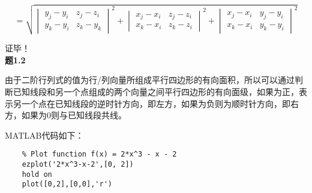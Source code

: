 \documentclass[UTF8]{ctexrep}
\begin{document}
$$
    = \sqrt{\begin{vmatrix}
            y_j-y_i & z_j-z_i \\
            y_k-y_i & z_k-y_k
        \end{vmatrix} ^2 + \begin{vmatrix}
            x_j-x_i & z_j-z_i \\
            x_k-x_i & z_k-z_i
        \end{vmatrix} ^2 + \begin{vmatrix}
            x_j-x_i & y_j-y_i \\
            x_k-x_i & y_k-y_i
        \end{vmatrix}^2}
$$

证毕！\\

{\noindent}\textbf{题1.2}

由于二阶行列式的值为行/列向量所组成平行四边形的有向面积，所以可以通过判断已知线段和另一个点组成的两个向量之间平行四边形的有向面级，如果为正，表示另一个点在已知线段的逆时针方向，即左方，如果为负则为顺时针方向，即右方，如果为0则与已知线段共线。

MATLAB代码如下：

\begin{lstlisting}
    % Plot function f(x) = 2*x^3 - x - 2
    ezplot('2*x^3-x-2',[0, 2])
    hold on
    plot([0,2],[0,0],'r')
    \end{lstlisting}
\end{document}
